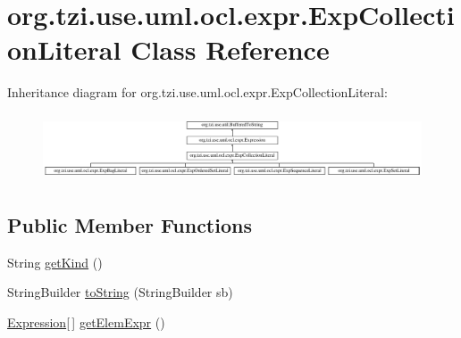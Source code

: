 \hypertarget{classorg_1_1tzi_1_1use_1_1uml_1_1ocl_1_1expr_1_1_exp_collection_literal}{\section{org.\-tzi.\-use.\-uml.\-ocl.\-expr.\-Exp\-Collection\-Literal Class Reference}
\label{classorg_1_1tzi_1_1use_1_1uml_1_1ocl_1_1expr_1_1_exp_collection_literal}
}
Inheritance diagram for org.\-tzi.\-use.\-uml.\-ocl.\-expr.\-Exp\-Collection\-Literal\-:\begin{figure}[H]
\begin{center}
\leavevmode
\includegraphics[height=2.014389cm]{classorg_1_1tzi_1_1use_1_1uml_1_1ocl_1_1expr_1_1_exp_collection_literal}
\end{center}
\end{figure}
\subsection*{Public Member Functions}
\begin{DoxyCompactItemize}
\item 
String \hyperlink{classorg_1_1tzi_1_1use_1_1uml_1_1ocl_1_1expr_1_1_exp_collection_literal_aa4b87c8ecb29980d60f8116581b7d10a}{get\-Kind} ()
\item 
String\-Builder \hyperlink{classorg_1_1tzi_1_1use_1_1uml_1_1ocl_1_1expr_1_1_exp_collection_literal_ad48a203b3b47b8a67a676cac299f6051}{to\-String} (String\-Builder sb)
\item 
\hyperlink{classorg_1_1tzi_1_1use_1_1uml_1_1ocl_1_1expr_1_1_expression}{Expression}\mbox{[}$\,$\mbox{]} \hyperlink{classorg_1_1tzi_1_1use_1_1uml_1_1ocl_1_1expr_1_1_exp_collection_literal_af35b0a7bb1049414aff08508a17b394e}{get\-Elem\-Expr} ()
\end{DoxyCompactItemize}
